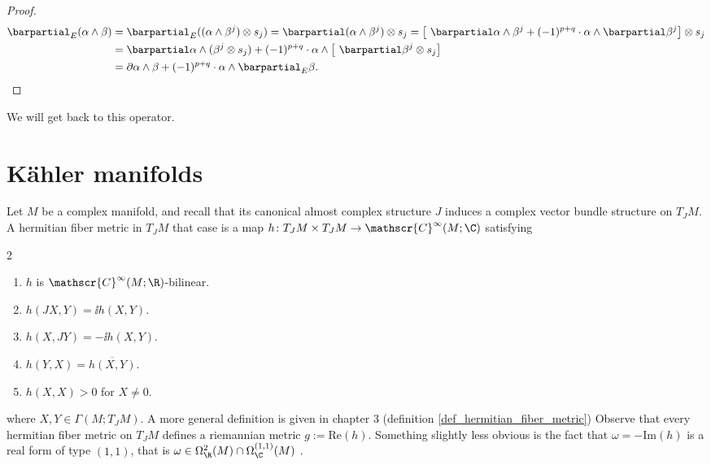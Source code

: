 \begin{proof}
    \begin{align*}
        \barpartial_E (\alpha \wedge \beta)&=\barpartial_E ((\alpha \wedge \beta^j) \otimes s_j)=\barpartial(\alpha \wedge \beta^j) \otimes s_j=\left[ \ \barpartial \alpha \wedge \beta^j + (-1)^{p+q} \cdot \alpha \wedge \barpartial \beta^j \right] \otimes s_j \\
        & = \barpartial \alpha \wedge (\beta^j \otimes s_j) + (-1)^{p+q} \cdot \alpha \wedge \left[ \ \barpartial \beta^j \otimes s_j \right] \\
        & = \partial \alpha \wedge \beta + (-1)^{p+q} \cdot \alpha \wedge \barpartial_E \beta.
    \end{align*}
\end{proof}
We will get back to this operator.

\section{Kähler manifolds}
Let \(M\) be a complex manifold, and recall that its canonical almost complex structure \(J\) induces a complex vector bundle structure on \(T_JM\). A hermitian fiber metric in \(T_JM\) that case is a map \(h\colon T_JM \times T_JM \to \mathscr{C}^\infty(M;\C)\) satisfying 
\begin{multicols}{2}
    \begin{enumerate}
        \item \(h\) is \(\mathscr{C}^\infty(M;\R)\)-bilinear.
        \item \(h(JX, Y)=\ii h(X,Y)\). 
        \item \(h(X,JY)=-\ii h(X,Y)\).
        \item \(h(Y,X)=\overline{h(X,Y)}\).
        \item \(h(X,X)>0\) for \(X\neq 0\).
    \end{enumerate}
\end{multicols}
where \(X,Y \in \Gamma(M;T_JM)\). A more general definition is given in chapter 3 (definition \ref{def_hermitian_fiber_metric}) Observe that every hermitian fiber metric on \(T_JM\) defines a riemannian metric \(g:=\mathrm{Re}(h)\). Something slightly less obvious is the fact that \(\omega=-\mathrm{Im}(h)\) is a real form of type \((1,1)\), that is  \(\omega \in \Omega_\R^2(M) \cap \Omega_\C^{(1,1)}(M)\) \parencite[Lemma 8.2]{lee_introCM}.

